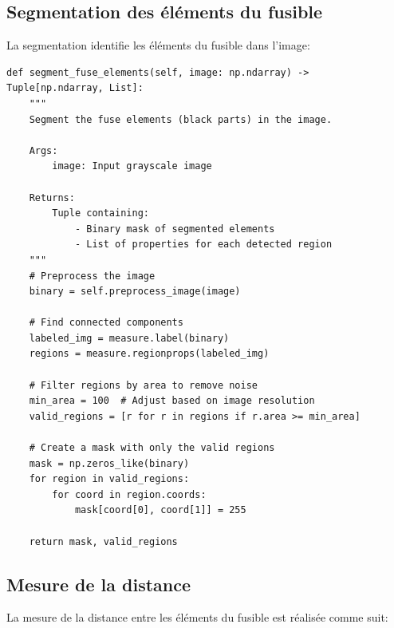 \documentclass[12pt,a4paper]{article}
\begin{document}
\subsection{Segmentation des éléments du fusible}

La segmentation identifie les éléments du fusible dans l'image:

\begin{lstlisting}
def segment_fuse_elements(self, image: np.ndarray) -> Tuple[np.ndarray, List]:
    """
    Segment the fuse elements (black parts) in the image.
    
    Args:
        image: Input grayscale image
        
    Returns:
        Tuple containing:
            - Binary mask of segmented elements
            - List of properties for each detected region
    """
    # Preprocess the image
    binary = self.preprocess_image(image)
    
    # Find connected components
    labeled_img = measure.label(binary)
    regions = measure.regionprops(labeled_img)
    
    # Filter regions by area to remove noise
    min_area = 100  # Adjust based on image resolution
    valid_regions = [r for r in regions if r.area >= min_area]
    
    # Create a mask with only the valid regions
    mask = np.zeros_like(binary)
    for region in valid_regions:
        for coord in region.coords:
            mask[coord[0], coord[1]] = 255
            
    return mask, valid_regions
\end{lstlisting}

\subsection{Mesure de la distance}

La mesure de la distance entre les éléments du fusible est réalisée comme suit:
\end{document}
